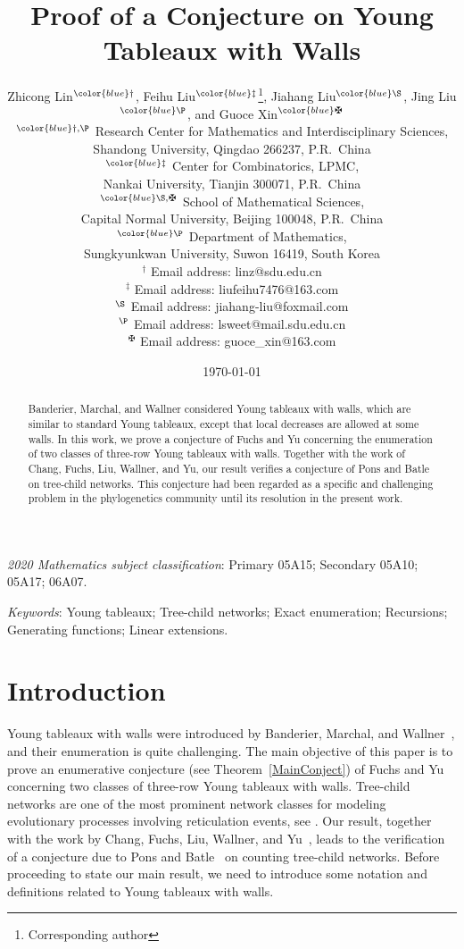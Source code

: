 \documentclass[reqno, 12pt]{article}
\title{Proof of a Conjecture on Young Tableaux with Walls}
\author{Zhicong Lin$^{\color{blue} \dag}$, Feihu Liu$^{\color{blue} \ddag}$\thanks{Corresponding author}, Jiahang Liu$^{\color{blue} \S}$, Jing Liu$^{\color{blue}\P}$, and Guoce Xin$^{\color{blue} \maltese}$
\\[2mm]
{\small $^{\color{blue} \dag, \P}$ Research Center for Mathematics and Interdisciplinary Sciences,}\\[-0.8ex]
{\small Shandong University, Qingdao 266237, P.R.~China}\\
{\small $^{\color{blue} \ddag}$ Center for Combinatorics, LPMC,}\\[-0.8ex]
{\small Nankai University, Tianjin 300071, P.R.~China}\\
{\small $^{\color{blue} \S,\maltese}$ School of Mathematical Sciences,}\\[-0.8ex]
{\small Capital Normal University, Beijing 100048, P.R.~China}\\
{\small $^{\color{blue}  \P}$ Department of Mathematics,}\\[-0.8ex]
{\small Sungkyunkwan University, Suwon  16419, South Korea}\\
{\small {\color{blue} $^\dag$} Email address: linz@sdu.edu.cn}\\
{\small {\color{blue} $^\ddag$} Email address: liufeihu7476@163.com}\\
{\small {\color{blue} $^\S$} Email address: jiahang-liu@foxmail.com}\\
{\small {\color{blue} $^\P$} Email address: lsweet@mail.sdu.edu.cn}\\
{\small {\color{blue} $^\maltese$} Email address: guoce\_xin@163.com}
}
\date{\today}
\theoremstyle{mydefinition}
\theoremstyle{myremark}
\numberwithin{algorithm}{section}
\begin{document}
\maketitle

\begin{abstract}
Banderier, Marchal, and Wallner considered Young tableaux with walls, which are similar to standard Young tableaux, except that local decreases are allowed at some walls. In this work, we prove a conjecture of Fuchs and Yu concerning the enumeration of two classes of three-row Young tableaux with walls. Together with the work of Chang, Fuchs, Liu, Wallner, and Yu, our result verifies a conjecture of Pons and Batle on tree-child networks. This conjecture had been regarded as a specific and challenging problem in the phylogenetics community until its resolution in the present work.
\end{abstract}

\noindent
\begin{small}
\emph{2020 Mathematics subject classification}: Primary 05A15; Secondary 05A10; 05A17; 06A07.
\end{small}

\noindent
\begin{small}
\emph{Keywords}: Young tableaux; Tree-child networks; Exact enumeration; Recursions; Generating functions; Linear extensions.
\end{small}

\tableofcontents

\section{Introduction}
Young tableaux with walls were introduced by
Banderier, Marchal, and  Wallner~\cite{C.Banderier18}, and their enumeration is quite challenging.
The main objective of this paper is to prove an enumerative conjecture (see Theorem~\ref{MainConject}) of Fuchs and Yu~\cite{Fang}
concerning  two classes of three-row Young tableaux with walls. Tree-child networks are one of the most prominent network classes for modeling evolutionary processes involving reticulation events, see \cite{PB,CZ,CFY}. Our result, together with the work by Chang, Fuchs, Liu, Wallner, and Yu~\cite{CFLWY}, leads to the verification of a conjecture due to Pons and Batle~\cite[Conjecture~1]{PB} on counting  tree-child networks. Before proceeding to state our main result, we need to introduce some notation and definitions related to Young tableaux with walls.
\end{document}
